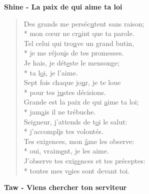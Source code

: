 \textbf{Shine - La paix de qui aime ta loi}
\begin{verse}
Des grands me perséc\underline{u}tent sans raison; \\*
mon cœur ne cr\underline{a}int que ta parole. \\
Tel celui qui tro\underline{u}ve un grand butin, \\*
je me réjou\underline{i}s de tes promesses. \\
Je hais, je dét\underline{e}ste le mensonge; \\*
ta l\underline{o}i, je l’aime. \\
Sept fois chaque jo\underline{u}r, je te loue \\*
pour tes j\underline{u}stes décisions. \\
Grande est la paix de qui \underline{a}ime ta loi; \\*
jam\underline{a}is il ne trébuche. \\
Seigneur, j’attends de t\underline{o}i le salut: \\*
j’accompl\underline{i}s tes volontés. \\
Tes exigences, mon \underline{â}me les observe: \\*
oui, vraim\underline{e}nt, je les aime. \\
J’observe tes exig\underline{e}nces et tes préceptes: \\*
toutes mes v\underline{o}ies sont devant toi. \\
\end{verse}
\textbf{Taw - Viens chercher ton serviteur}
